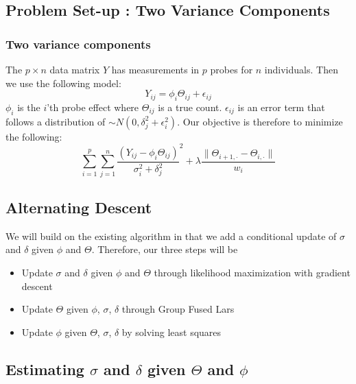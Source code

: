 \documentclass[11pt]{article}
\begin{document}
\subsection*{Problem Set-up : Two Variance Components}
\subsubsection*{Two variance components}
The $p \times n$ data matrix $Y$ has measurements in $p$ probes for $n$ individuals. Then we use the following model:
\begin{equation}
Y_{ij} = \phi_i \Theta_{ij} + \epsilon_{ij}
\end{equation}
$\phi_i$ is the $i$'th probe effect where $\Theta_{ij}$ is a true count. $\epsilon_{ij}$ is an error term that follows a distribution of $\sim N(0, \delta_j^2 + \epsilon_i^2)$. Our objective is therefore to minimize the following:
\begin{equation}
\sum_{i=1}^{p} \sum_{j=1}^{n} \frac{(Y_{ij} - \phi_i \Theta_{ij})}{\sigma_i^2 + \delta_j^2} ^2 + \lambda \frac{\|\Theta_{i+1,\cdot} - \Theta_{i, \cdot}\|}{w_i}
\end{equation}



\subsection*{Alternating Descent}

We will build on the existing algorithm in that we add a conditional update of $\sigma$ and $\delta$ given $\phi$ and $\Theta$. Therefore, our three steps will be

\begin{itemize}
\item
Update $\sigma$ and $\delta$ given $\phi$ and $\Theta$ through likelihood maximization with gradient descent
\item
Update $\Theta$ given $\phi$, $\sigma$, $\delta$ through Group Fused Lars
\item
Update $\phi$ given $\Theta$, $\sigma$, $\delta$ by solving least squares

\end{itemize}


\subsection*{Estimating $\sigma$ and $\delta$ given $\Theta$ and $\phi$}
\end{document}
